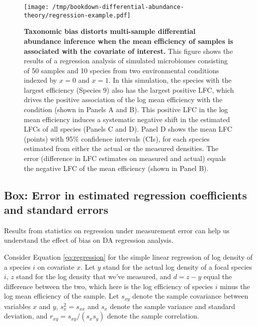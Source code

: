 \documentclass[
]{article}
\theoremstyle{definition}
\theoremstyle{definition}
\theoremstyle{definition}
\theoremstyle{definition}
\theoremstyle{remark}
\begin{document}
\begin{figure}
\centering
\texttt{[image: /tmp/bookdown-differential-abundance-theory/regression-example.pdf]}
\caption{\label{fig:regression-example}\textbf{Taxonomic bias distorts multi-sample differential abundance inference when the mean efficiency of samples is associated with the covariate of interest.} This figure shows the results of a regression analysis of simulated microbiomes consisting of 50 samples and 10 species from two environmental conditions indexed by \(x=0\) and \(x=1\). In this simulation, the species with the largest efficiency (Species 9) also has the largest positive LFC, which drives the positive association of the log mean efficiency with the condition (shown in Panels A and B). This positive LFC in the log mean efficiency induces a systematic negative shift in the estimated LFCs of all species (Panels C and D). Panel D shows the mean LFC (points) with 95\% confidence intervals (CIs), for each species estimated from either the actual or the measured densities. The error (difference in LFC estimates on measured and actual) equals the negative LFC of the mean efficiency (shown in Panel B).}
\end{figure}



\hypertarget{regression-error}{%
\subsection{Box: Error in estimated regression coefficients and standard errors}\label{regression-error}}

Results from statistics on regression under measurement error can help us understand the effect of bias on DA regression analysis.

Consider Equation \eqref{eq:regression} for the simple linear regression of log density of a species \(i\) on covariate \(x\).
Let \(y\) stand for the actual log density of a focal species \(i\), \(z\) stand for the log density that we've measured, and \(d = z - y\) equal the difference between the two, which here is the log efficiency of species \(i\) minus the log mean efficiency of the sample.
Let \(s_{xy}\) denote the sample covariance between variables \(x\) and \(y\), \(s^{2}_{x} = s_{xx}\) and \(s_{x}\) denote the sample variance and standard deviation, and \(r_{xy} = s_{xy}/(s_{x}s_{y})\) denote the sample correlation.
\end{document}
